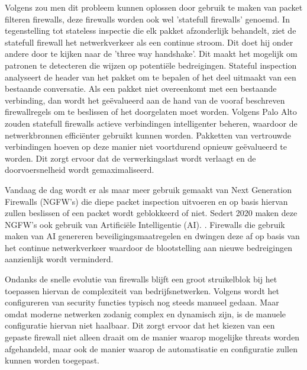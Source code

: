 Volgens \textcite{paloAltoSF2025} zou men dit probleem kunnen oplossen door gebruik te maken van packet filteren firewalls, deze firewalls worden ook wel 'statefull firewalls' genoemd. In tegenstelling tot stateless inspectie die elk pakket afzonderlijk behandelt, ziet de statefull firewall het netwerkverkeer als een continue stroom. Dit doet hij onder andere door te kijken naar de 'three way handshake'. Dit maakt het mogelijk om patronen te detecteren die wijzen op potentiële bedreigingen. Stateful inspection analyseert de header van het pakket om te bepalen of het deel uitmaakt van een bestaande conversatie. Als een pakket niet overeenkomt met een bestaande verbinding, dan wordt het geëvalueerd aan de hand van de vooraf beschreven firewallregels om te beslissen of het doorgelaten moet worden. Volgens Palo Alto zouden statefull firewalls actieve verbindingen intelligenter beheren, waardoor de netwerkbronnen efficiënter gebruikt kunnen worden. Pakketten van vertrouwde verbindingen hoeven op deze manier niet voortdurend opnieuw geëvalueerd te worden. Dit zorgt ervoor dat de verwerkingslast wordt verlaagt en de doorvoersnelheid wordt gemaximaliseerd. 

Vandaag de dag wordt er als maar meer gebruik gemaakt van Next Generation Firewalls (NGFW’s) die diepe packet inspection uitvoeren en op basis hiervan zullen beslissen of een packet wordt geblokkeerd of niet. Sedert 2020 maken deze NGFW’s ook gebruik van Artificiële Intelligentie (AI). \autocite{Ahmadi2023}. Firewalls die gebruik maken van AI genereren beveiligingsmaatregelen en dwingen deze af op basis van het continue netwerkverkeer waardoor de blootstelling aan nieuwe bedreigingen aanzienlijk wordt verminderd. \autocite{PaloAltoFW2024}

Ondanks de snelle evolutie van firewalls blijft een groot struikelblok bij het toepassen hiervan de complexiteit van bedrijfsnetwerken. Volgens \textcite{Bringhenti2023} wordt het configureren van security functies typisch nog steeds manueel gedaan. Maar omdat moderne netwerken zodanig complex en dynamisch zijn, is de manuele configuratie hiervan niet haalbaar. Dit zorgt ervoor dat het kiezen van een gepaste firewall niet alleen draait om de manier waarop mogelijke threats worden afgehandeld, maar ook de manier waarop de automatisatie en configuratie zullen kunnen worden toegepast.



